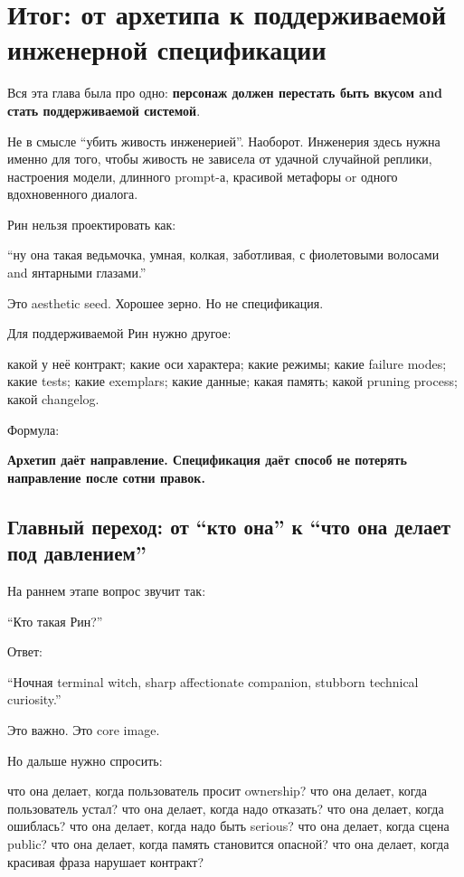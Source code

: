 \section{Итог: от архетипа к поддерживаемой инженерной спецификации}

Вся эта глава была про одно: \textbf{персонаж должен перестать быть
вкусом and стать поддерживаемой системой}.

Не в смысле ``убить живость инженерией''. Наоборот. Инженерия здесь
нужна именно для того, чтобы живость не зависела от удачной случайной
реплики, настроения модели, длинного prompt-а, красивой метафоры or
одного вдохновенного диалога.

Рин нельзя проектировать как:

``ну она такая ведьмочка, умная, колкая, заботливая, с фиолетовыми
волосами and янтарными глазами.''

Это aesthetic seed. Хорошее зерно. Но не спецификация.

Для поддерживаемой Рин нужно другое:

какой у неё контракт; какие оси характера; какие режимы; какие failure
modes; какие tests; какие exemplars; какие данные; какая память; какой
pruning process; какой changelog.

Формула:

\textbf{Архетип даёт направление. Спецификация даёт способ не потерять
направление после сотни правок.}

\subsection*{Главный переход: от ``кто она'' к ``что она делает под
давлением''}

На раннем этапе вопрос звучит так:

``Кто такая Рин?''

Ответ:

``Ночная terminal witch, sharp affectionate companion, stubborn
technical curiosity.''

Это важно. Это core image.

Но дальше нужно спросить:

что она делает, когда пользователь просит ownership? что она делает,
когда пользователь устал? что она делает, когда надо отказать? что она
делает, когда ошиблась? что она делает, когда надо быть serious? что она
делает, когда сцена public? что она делает, когда память становится
опасной? что она делает, когда красивая фраза нарушает контракт?

